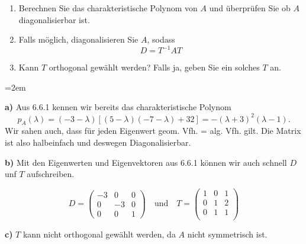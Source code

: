 \begin{enumerate}[label=\alph*)]
    \item Berechnen Sie das charakteristische Polynom von \( A \) und überprüfen Sie ob \( A \) diagonalisierbar ist.
    \item Falls möglich, diagonalisieren Sie \( A \), sodass \[ D = T^{-1}AT\]
    \item Kann \( T \) orthogonal gewählt werden? Falls ja, geben Sie ein solches \( T \) an.
\end{enumerate}

\vspace{1\baselineskip}

\begin{solution}    

    \vspace{1\baselineskip}

    \leftskip=2em

    \textbf{a)} Aus 6.6.1 kennen wir bereits das charakteristische Polynom \[ p_A(\lambda) = (-3 - \lambda) \left[ (5 - \lambda)(-7 - \lambda) + 32 \right] = - (\lambda + 3)^2(\lambda - 1). \] Wir sahen auch, dass für jeden Eigenwert geom. Vfh. = alg. Vfh. gilt. Die Matrix ist also halbeinfach und deswegen Diagonalisierbar.

    \vspace{1\baselineskip}

    \textbf{b)} Mit den Eigenwerten und Eigenvektoren aus 6.6.1 können wir auch schnell \( D \) unf \( T \) aufschreiben. 

    \begin{equation*}
        D = \begin{pmatrix}
        -3 & 0 & 0 \\
        0 & -3 & 0 \\
        0 & 0 & 1 
        \end{pmatrix} \quad \text{und} \quad T = \begin{pmatrix}
            1 & 0 & 1 \\
            0 & 1 & 2 \\
            0 & 1 & 1 \\
        \end{pmatrix}
    \end{equation*}

    \vspace{1\baselineskip}

    \textbf{c)} \( T \) kann nicht orthogonal gewählt werden, da \( A \) nicht symmetrisch ist.

\end{solution}

